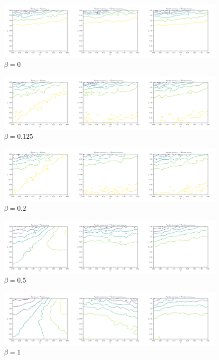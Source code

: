 \documentclass[a4paper,landscape,hidelinks,14pt]{extarticle}
\begin{document}
\begin{figure}[h!]
  \centering
  \includegraphics[width=.9\linewidth]{fig/beta-0.png}
  \caption{$ \beta = 0 $}
\end{figure}

\begin{figure}[h!]
  \centering
  \includegraphics[width=.9\linewidth]{fig/beta-0,125.png}
  \caption{$ \beta = 0.125 $}
\end{figure}

\begin{figure}[h!]
  \centering
  \includegraphics[width=.9\linewidth]{fig/beta-0,2.png}
  \caption{$ \beta = 0.2 $}
\end{figure}

\begin{figure}[h!]
  \centering
  \includegraphics[width=.9\linewidth]{fig/beta-0,5.png}
  \caption{$ \beta = 0.5 $}
\end{figure}

\begin{figure}[h!]
  \centering
  \includegraphics[width=.9\linewidth]{fig/beta-1.png}
  \caption{$ \beta = 1 $}
\end{figure}
\end{document}
